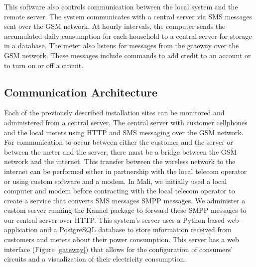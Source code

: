 \documentclass[conference]{IEEEtran}
\begin{document}
This software also controls communication between the local system and
the remote server.
The system communicates with a central server via SMS messages sent over
the GSM network.
At hourly intervals, the computer sends the accumulated daily
consumption for each household to a central server for storage in a
database.
The meter also listens for messages from the gateway over the GSM network.
These messages include commands to add credit to an account or to turn
on or off a circuit.

\subsection{Communication Architecture}
Each of the previously described installation sites can be monitored and
administered from a central server.
The central server with customer cellphones and the
local meters using HTTP and SMS messaging over the GSM
network.
For communication to occur between either the customer and the server
or between the meter and the server, there must be a bridge between
the GSM network and the internet.
This transfer between the wireless network to the internet can be
performed either in partnership with the local telecom operator or using
custom software and a modem.
In Mali, we initially used a local computer and modem before contracting
with the local telecom operator to create a service that converts
SMS messages SMPP messages.
We administer a custom server running the Kannel package to forward
these SMPP messages to our central server over HTTP.
This system's server uses a Python based web-application and a
PostgreSQL database to store information received from customers and
meters about their power consumption.
This server has a web interface (Figure \ref{gateway}) that allows for
the configuration of consumers' circuits and a visualization of their
electricity consumption.

\end{document}
